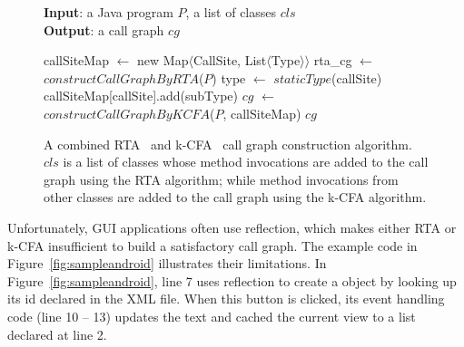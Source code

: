 \begin{figure}[t]
\textbf{Input}: a Java program $P$, a list of classes $cls$\\
\textbf{Output}: a call graph $cg$\\
\vspace{-5mm}
\begin{algorithmic}[1]
\STATE callSiteMap $\leftarrow$ new Map$\langle$CallSite, List$\langle$Type$\rangle$$\rangle$
\STATE rta\_cg $\leftarrow$ $constructCallGraphByRTA$($P$)
\STATE type $\leftarrow$ $staticType$(callSite)
\STATE callSiteMap[callSite].add(subType)
\ENDIF
\ENDFOR
\ENDIF
\ENDFOR
\ENDFOR
\STATE $cg$ $\leftarrow$ $constructCallGraphByKCFA$($P$, callSiteMap)
\RETURN $cg$
\vspace{-2mm}
\end{algorithmic}
\label{fig:cgalgorithm}
\caption{A combined  RTA~\cite{rta} and k-CFA~\cite{kcfa} call graph construction algorithm.
$cls$ is a list of classes whose method invocations are added to the
call graph using the RTA algorithm; while method invocations from other classes
are added to the call graph using the k-CFA algorithm.
} 
\end{figure}


Unfortunately, GUI applications often use reflection, which makes either
RTA or k-CFA insufficient to build a satisfactory call graph. 
The example code in Figure~\ref{fig:sampleandroid}  illustrates their limitations.
In Figure~\ref{fig:sampleandroid}, line 7 uses reflection to create a 
object by looking up its id declared in the XML file. When this button
is clicked, its event handling code (line 10 -- 13) updates the text and cached
the current view to a list declared at line 2.

